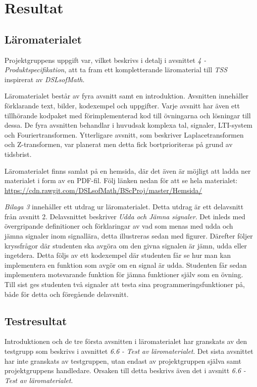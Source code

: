 \documentclass[]{article}
\begin{document}
\section{Resultat}


%

\subsection{Läromaterialet}
Projektgruppens uppgift var, vilket beskrivs i detalj i avsnittet
\textit{4 - Produktspecifikation}, att ta fram ett kompletterande
läromaterial till \textit{TSS} inspirerat av \textit{DSLsofMath}.

Läromaterialet består av fyra avsnitt samt en introduktion. Avsnitten
innehåller förklarande text, bilder, kodexempel och uppgifter. Varje
avsnitt har även ett tillhörande kodpaket med förimplementerad kod
till övningarna och lösningar till dessa. De fyra avsnitten behandlar
i huvudsak komplexa tal, signaler, LTI-system och Fouriertransformen.
Ytterligare avsnitt, som beskriver Laplacetransformen och
Z-transformen, var planerat men detta fick bortprioriteras på grund av
tidsbrist.

Läromaterialet finns samlat på en hemsida, där det även är möjligt att
ladda ner materialet i form av en PDF-fil. Följ länken nedan för att
se hela materialet:
\url{https://cdn.rawgit.com/DSLsofMath/BScProj/master/Hemsida/}

\textit{Bilaga 3} innehåller ett utdrag ur läromaterialet. Detta
utdrag är ett delavsnitt från avsnitt 2. Delavsnittet beskriver
\textit{Udda och Jämna signaler}. Det inleds med övergripande
definitioner och förklaringar av vad som menas med udda och jämna
signaler inom signallära, detta illustreras sedan med
figurer. Därefter följer kryssfrågor där studenten ska avgöra om den
givna signalen är jämn, udda eller ingetdera. Detta följs av ett
kodexempel där studenten får se hur man kan implementera en funktion
som avgör om en signal är udda. Studenten får sedan implementera
motsvarande funktion för jämna funktioner själv som en övning. Till
sist ges studenten två signaler att testa sina
programmeringsfunktioner på, både för detta och föregående delavsnitt.


\subsection{Testresultat}
Introduktionen och de tre första avsnitten i läromaterialet har
granskats av den testgrupp som beskrivs i avsnittet \textit{6.6 - Test av läromaterialet}. 
Det sista avsnittet har
inte granskats av testgruppen, utan endast av projektgruppen själva
samt projektgruppens handledare. Orsaken till detta beskrivs även det 
 i avsnitt \textit{6.6 - Test av läromaterialet}.
\end{document}
